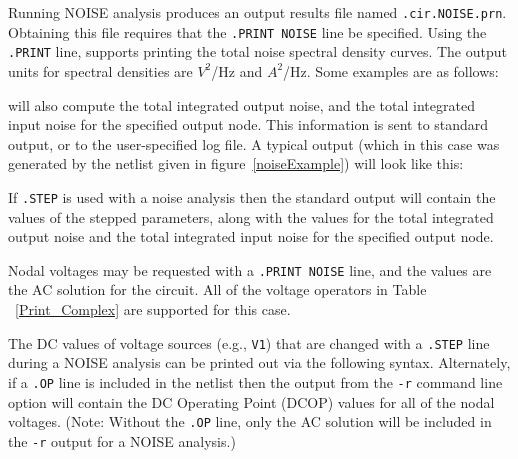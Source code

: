 \label{NOISE_print}

Running \Xyce{} NOISE analysis produces an output results file named
\verb|.cir.NOISE.prn|. Obtaining this file requires that the \verb|.PRINT NOISE| line
be specified. Using the \texttt{.PRINT} line, \Xyce{} supports printing the total 
noise spectral density curves.  The output units for spectral densities 
are $V^2$/Hz and $A^2$/Hz.  Some examples are as follows: 

\Xyce{} will also compute the total integrated output noise, and the total
integrated input noise for the specified output node.  This information is sent
to standard output, or to the user-specified log file.  A typical output (which 
in this case was generated by the netlist given in figure~\ref{noiseExample}) will
look like this:

If \texttt{.STEP} is used with a noise analysis then the \Xyce{} standard output
will contain the values of the stepped parameters, along with the values
for the total integrated output noise and the total integrated input 
noise for the specified output node.

Nodal voltages may be requested with a \verb|.PRINT NOISE| line, and the values 
are the AC solution for the circuit.  All of the voltage operators in 
Table ~\ref{Print_Complex} are supported for this case.

The DC values of voltage sources (e.g., \texttt{V1}) that are changed with 
a \verb|.STEP| line during a NOISE analysis can be printed out via the
following syntax. Alternately, if a \verb|.OP| line is included in the 
netlist then the output from the \verb+-r+ command line option will 
contain the DC Operating Point (DCOP) values for all of the nodal 
voltages.  (Note: Without the \verb|.OP| line, only the AC solution will 
be included in the \verb+-r+ output for a NOISE analysis.) 



